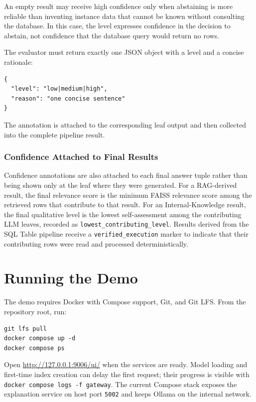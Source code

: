 \documentclass[11pt,a4paper]{article}
\newcommand{\code}[1]{\texttt{#1}}
\begin{document}
An empty result may receive high confidence only when abstaining is more
reliable than inventing instance data that cannot be known without consulting
the database. In this case, the level expresses confidence in the decision to
abstain, not confidence that the database query would return no rows.

The evaluator must return exactly one JSON object with a level and a concise
rationale:

\begin{lstlisting}[style=codestyle]
{
  "level": "low|medium|high",
  "reason": "one concise sentence"
}
\end{lstlisting}


The annotation is attached to the corresponding leaf output and then collected
into the complete pipeline result.

\subsubsection{Confidence Attached to Final Results}

Confidence annotations are also attached to each final answer tuple rather than
being shown only at the leaf where they were generated.
For a RAG-derived result, the final relevance score is the minimum FAISS
relevance score among the retrieved rows that contribute to that result. For an
Internal-Knowledge result, the final qualitative level is the lowest
self-assessment among the contributing LLM leaves, recorded as
\code{lowest\_contributing\_level}. Results derived from the SQL Table pipeline
receive a \code{verified\_execution} marker to indicate that their contributing
rows were read and processed deterministically.


\section{Running the Demo}

The demo requires Docker with Compose support, Git, and Git LFS. From the
repository root, run:

\begin{lstlisting}[style=codestyle]
git lfs pull
docker compose up -d
docker compose ps
\end{lstlisting}

Open \url{http://127.0.0.1:9006/ui/} when the services are ready. Model loading
and first-time index creation can delay the first request; their progress is
visible with \code{docker compose logs -f gateway}. The current Compose stack
exposes the explanation service on host port \code{5002} and keeps Ollama on the
internal network.
\end{document}
